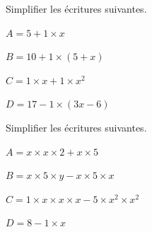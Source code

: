 \documentclass[a4paper]{book}
\begin{document}
    \begin{exemple}
        Simplifier les écritures suivantes.

        \medskip

        \begin{minipage}{0.24\linewidth}
            $A=5+1\times x$

            \vspace{1cm}
        \end{minipage}
        \hfill\vline\hfill
        \begin{minipage}{0.24\linewidth}
            $B=10+1\times(5+x)$

            \vspace{1cm}
        \end{minipage}
        \hfill\vline\hfill
        \begin{minipage}{0.24\linewidth}
            $C=1\times x + 1 \times x^2$

            \vspace{1cm}
        \end{minipage}
        \hfill\vline\hfill
        \begin{minipage}{0.24\linewidth}
            $D=17-1\times(3x-6)$

            \vspace{1cm}
        \end{minipage}
    \end{exemple}


    \begin{exemple}[Bilan]
        Simplifier les écritures suivantes.
        
        \medskip

        \begin{minipage}{0.24\linewidth}
            $A=x\times x\times2+x\times5$

            \vspace{1cm}
        \end{minipage}
        \hfill\vline\hfill
        \begin{minipage}{0.24\linewidth}
            $B=x\times5\times y-x\times5\times x$

            \vspace{1cm}
        \end{minipage}
        \hfill\vline\hfill
        \begin{minipage}{0.24\linewidth}
            $C=1\times x \times x \times x - 5 \times x^2\times x^2$

            \vspace{1cm}
        \end{minipage}
        \hfill\vline\hfill
        \begin{minipage}{0.24\linewidth}
            $D=8-1\times x$

            \vspace{1cm}
        \end{minipage}
    \end{exemple}
\end{document}
